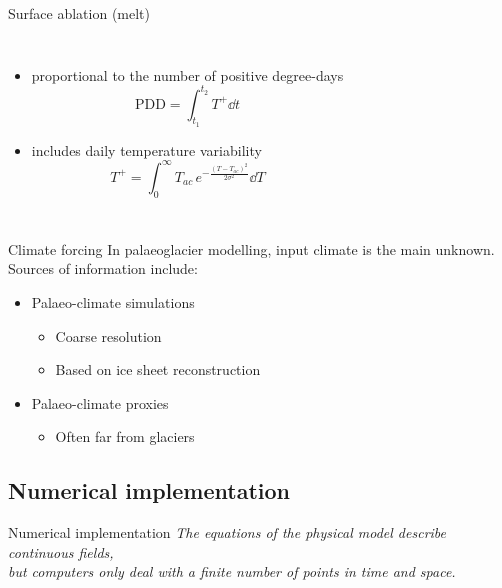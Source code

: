     \begin{frame}{Surface ablation (melt)}
      \begin{columns}
        \column{60mm}
         \begin{itemize}
           \item<1-> proportional to the number of positive degree-days
             $$ \mathrm{PDD} = \int_{t_1}^{t_2} T^{+} \dd{t} $$
           \item<3-> includes daily temperature variability
             $$ T^{+} = \int_{0}^{\infty} T_{ac}
                         \, e^{-\frac{(T-T_{ac})^2}{2\sigma^2}} \dd{T} $$
          \end{itemize}
        \column{60mm}
          \centering    
      \end{columns}
    \end{frame}

    \begin{frame}{Climate forcing}
      In palaeoglacier modelling, input climate is the main unknown.\\
      Sources of information include:\\\bigskip
      \begin{itemize}
        \item Palaeo-climate simulations
          \begin{itemize}
            \item Coarse resolution
            \item Based on ice sheet reconstruction
          \end{itemize}
        \item Palaeo-climate proxies
          \begin{itemize}
            \item Often far from glaciers
          \end{itemize}
      \end{itemize}
    \end{frame}


\subsection{Numerical implementation}

    \begin{sectionframe}{Numerical implementation}
      \emph{The equations of the physical model describe \alert{continuous}
        fields, \\ but computers only deal with a \alert{finite number of
        points} in time and space.}
    \end{sectionframe}

